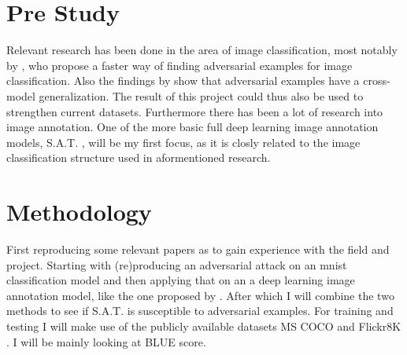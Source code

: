 \documentclass[12pt]{extarticle}
\begin{document}

\section{Pre Study}
Relevant research has been done in the area of image classification, most notably by \citeauthor{goodfellow2015explaining}, who propose a faster way of finding adversarial examples for image classification. Also the findings by \citeauthor{venkatesh} show that adversarial examples have a cross-model generalization. The result of this project could thus also be used to strengthen current datasets. Furthermore there has been a lot of research into image annotation. One of the more basic full deep learning image annotation models, S.A.T. \cite{xu2016show}, will be my first focus, as it is closly related to the image classification structure used in aformentioned research.

\section{Methodology}
First reproducing some relevant papers as to gain experience with the field and project. Starting with (re)producing an adversarial attack on an mnist classification model \cite{szegedy2014intriguing} and then applying that on an a deep learning image annotation model, like the one proposed by \citeauthor{xu2016show}. After which I will combine the two methods to see if S.A.T. is susceptible to adversarial examples. For training and testing I will make use of the publicly available datasets MS COCO \cite{lin2015microsoft} and Flickr8K \cite{Flickr8k}. I will be mainly looking at BLUE \cite{papineni_roukos_ward_zhu_2001} score.
\end{document}
